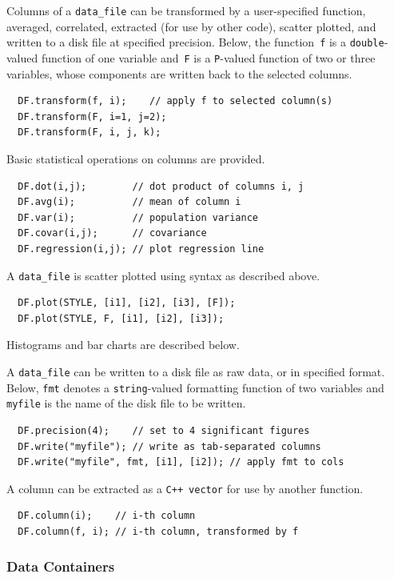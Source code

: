\documentclass[12pt,letterpaper]{book}
\newcommand{\code}[1]{\texttt{#1}}
\newcommand{\filename}[1]{\texttt{#1}}
\newcommand{\findex}[1]{\ignorespaces}
\begin{document}
Columns of a \code{data\_file} can be transformed by a user-specified
function, averaged, correlated, extracted (for use by other code),
scatter plotted, and written to a disk file at specified
precision. Below, the function~\code{f} is a \code{double}-valued
function of one variable and~\code{F} is a \code{P}-valued function of
two or three variables, whose components are written back to the
selected columns.
\findex{data\_file.transform}
\begin{verbatim}
  DF.transform(f, i);    // apply f to selected column(s)
  DF.transform(F, i=1, j=2);
  DF.transform(F, i, j, k);
\end{verbatim}
Basic statistical operations on columns are provided.
\findex{data\_file.dot}
\findex{data\_file.avg}
\findex{data\_file.var}
\findex{data\_file.covar}
\findex{data\_file.regression}
\begin{verbatim}
  DF.dot(i,j);        // dot product of columns i, j
  DF.avg(i);          // mean of column i
  DF.var(i);          // population variance
  DF.covar(i,j);      // covariance
  DF.regression(i,j); // plot regression line
\end{verbatim}
A \code{data\_file} is scatter plotted using syntax as described above.
\findex{data\_file.plot}
\begin{verbatim}
  DF.plot(STYLE, [i1], [i2], [i3], [F]);
  DF.plot(STYLE, F, [i1], [i2], [i3]);
\end{verbatim}
Histograms and bar charts are described below.

A \code{data\_file} can be written to a disk file as raw data, or in
specified format. Below, \code{fmt} denotes a \code{string}-valued
formatting function of two variables and \filename{myfile} is the
name of the disk file to be written.
\findex{data\_file.precision}
\findex{data\_file.write}
\begin{verbatim}
  DF.precision(4);    // set to 4 significant figures
  DF.write("myfile"); // write as tab-separated columns
  DF.write("myfile", fmt, [i1], [i2]); // apply fmt to cols
\end{verbatim}
A column can be extracted as a \code{C++}~\code{vector} for use by
another function.
\findex{data\_file.column}
\begin{verbatim}
  DF.column(i);    // i-th column
  DF.column(f, i); // i-th column, transformed by f
\end{verbatim}


\subsubsection*{Data Containers}
\end{document}
